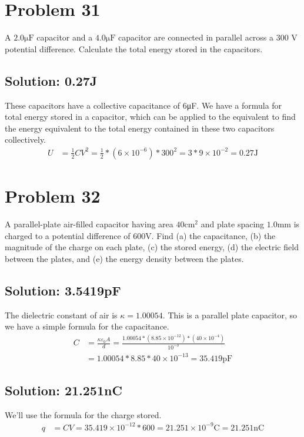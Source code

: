 \documentclass[12pt]{article}
\begin{document}
\pagebreak
\section{Problem 31}
A $2.0 \unit{\micro\farad}$ capacitor and a $4.0 \unit{\micro\farad}$ capacitor are connected in parallel across a 300 V potential difference.
Calculate the total energy stored in the capacitors.

\subsection*{Solution: 0.27J}
These capacitors have a collective capacitance of 6\unit{\micro\farad}. 
We have a formula for total energy stored in a capacitor, which can be applied to the equivalent to find the energy equivalent to the total energy contained in these two capacitors collectively.
\begin{align*}
    U   &=  \frac{1}{2}CV^2
        =   \frac{1}{2}*(6 \times 10^{-6})*300^2
        =   3 * 9 \times 10^{-2}
        =   \boxed{0.27 \unit{\joule}}
\end{align*}

\pagebreak
\section{Problem 32}
A parallel-plate air-filled capacitor having area $40\unit{\centi\meter^2}$ and plate spacing $1.0 \unit{\milli\meter}$ is charged to a potential difference of $600 \unit{\volt}$. 
Find (a) the capacitance, (b) the magnitude of the charge on each plate, (c) the stored energy, (d) the electric field between the plates, and (e) the energy density between the plates.

\subsection{Solution: 3.5419pF}
The dielectric constant of air is $\kappa = 1.00054$.
This is a parallel plate capacitor, so we have a simple formula for the capacitance. 
\begin{align*}
    C   &=  \frac{\kappa\varepsilon_0 A}{d}
        =   \frac{1.00054*(8.85 \times 10^{-12})*(40 \times 10^{-4})}{10^{-3}}\\
        &=  1.00054 * 8.85 * 40 \times 10^{-13}
        =   \boxed{35.419 \unit{\pico\farad}}
\end{align*}

\subsection{Solution: 21.251nC}
We'll use the formula for the charge stored. 
\begin{align*}
    q   &=  CV
        =   35.419 \times 10^{-12} * 600
        =   21.251 \times 10^{-9} \unit{\coulomb}
        =   \boxed{21.251 \unit{\nano\coulomb}}
\end{align*}
\end{document}
